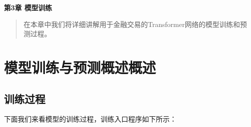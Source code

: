 \newpage
\maketitle
\begin{center}
\Large \textbf{第3章 模型训练} \quad 
\end{center}
\begin{abstract}
在本章中我们将详细讲解用于金融交易的Transformer网络的模型训练和预测过程。
\end{abstract}
\section{模型训练与预测概述概述}
\subsection{训练过程}
下面我们来看模型的训练过程，训练入口程序如下所示：
